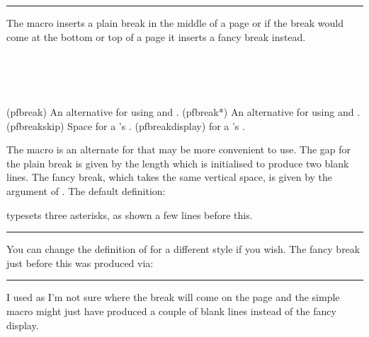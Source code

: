 \fancybreak{\pfbreakdisplay}

    The \cmd{\plainfancybreak} macro inserts a plain break in the middle of
a page or if the break would come at the bottom or top of a page it
inserts a fancy break instead.

\begin{syntax}
\cmd{\pfbreak} \cmd{\pfbreak*} \\
\lnc{\pfbreakskip} \\
\cmd{\pfbreakdisplay} \\
\end{syntax}
\glossary(pfbreak)
  {}%
  {An alternative for  using 
   and .}
\glossary(pfbreak*)
  {}%
  {An alternative for  using 
   and .}
\glossary(pfbreakskip)%
  {}%
  {Space for a 's .}
\glossary(pfbreakdisplay)%
  {}%
  { for a 's .}

The \cmd{\pfbreak} macro is an alternate for \cmd{\plainfancybreak} that may
be more convenient to use. The gap for the plain break is given by the
length \lnc{\pfbreakskip} which is initialised to produce two blank lines.
The fancy break, which takes the same vertical space, is given by the
 argument of \cmd{\pfbreakdisplay}. The default definition:
\begin{lcode}
\newcommand*{\pfbreakdisplay}{*\quad*\quad*}
\end{lcode}
typesets three asterisks, as shown a few lines before this.


\renewcommand{\pfbreakdisplay}{%
 \ensuremath{\clubsuit\quad\diamondsuit\quad\clubsuit}}
\fancybreak{\pfbreakdisplay}

    You can change the definition of \cmd{\pfbreakdisplay} for a different
style if you wish. The
fancy break just before this was produced via:
\begin{lcode}
\renewcommand{\pfbreakdisplay}{%
  \ensuremath{\clubsuit\quad\diamondsuit\quad\clubsuit}}
\fancybreak{\pfbreakdisplay}
\end{lcode}
I used \cmd{\fancybreak} as I'm not sure where the break will come on the
page and the simple \cmd{\pfbreak} macro might just have produced a couple
of blank lines instead of the fancy display.

